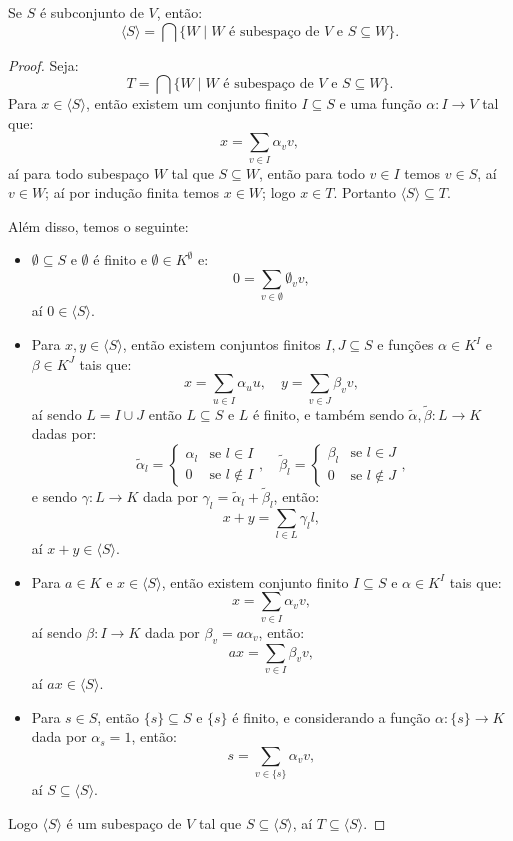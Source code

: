 \documentclass[11pt,twoside,a4paper]{book}
\begin{document}
\begin{proposicao}
Se $S$ é subconjunto de $V$, então:
\[
\langle S\rangle=\bigcap\{W\mid W\text{ é subespaço de }V\text{ e }S\subseteq W\}.
\]
\end{proposicao}
\begin{proof}
Seja:
\[
T=\bigcap\{W\mid W\text{ é subespaço de }V\text{ e }S\subseteq W\}.
\]
Para $x\in \langle S\rangle$, então existem um conjunto finito $I\subseteq S$ e uma função $\alpha:I\rightarrow V$ tal que:
\[
x=\sum\limits_{v\in I}\alpha_vv,
\]
aí para todo subespaço $W$ tal que $S\subseteq W$, então para todo $v\in I$ temos $v\in S$, aí $v\in W$; aí por indução finita temos $x\in W$; logo $x\in T$. Portanto $\langle S\rangle\subseteq T$.

\medskip
\noindent
Além disso, temos o seguinte:
\begin{itemize}
\item $\emptyset\subseteq S$ e $\emptyset$ é finito e $\emptyset\in K^\emptyset$ e:
\[
0=\sum_{v\in\emptyset}\emptyset_vv,
\]
aí $0\in\langle S\rangle$.
\item Para $x,y\in\langle S\rangle$, então existem conjuntos finitos $I,J\subseteq S$ e funções $\alpha\in K^I$ e $\beta\in K^J$ tais que:
\[
x=\sum\limits_{u\in I}\alpha_uu,\quad y=\sum\limits_{v\in J}\beta_vv,
\]
aí sendo $L=I\cup J$ então $L\subseteq S$ e $L$ é finito, e também sendo $\tilde{\alpha},\tilde{\beta}:L\rightarrow K$ dadas por:
\[
\tilde{\alpha}_l=\left\{\begin{array}{cl}\alpha_l&\text{se }l\in I\\0&\text{se }l\notin I\end{array}\right.,\quad\tilde{\beta}_l=\left\{\begin{array}{cl}\beta_l&\text{se }l\in J\\0&\text{se }l\notin J\end{array}\right.,
\]
e sendo $\gamma:L\rightarrow K$ dada por $\gamma_l=\tilde{\alpha}_l+\tilde{\beta}_l$, então:
\[
x+y=\sum_{l\in L}\gamma_ll,
\]
aí $x+y\in\langle S\rangle$.
\item Para $a\in K$ e $x\in\langle S\rangle$, então existem conjunto finito $I\subseteq S$ e $\alpha\in K^I$ tais que:
\[
x=\sum_{v\in I}\alpha_vv,
\]
aí sendo $\beta:I\rightarrow K$ dada por $\beta_v=a\alpha_v$, então:
\[
ax=\sum_{v\in I}\beta_vv,
\]
aí $ax\in\langle S\rangle$.
\item Para $s\in S$, então $\{s\}\subseteq S$ e $\{s\}$ é finito, e considerando a função $\alpha:\{s\}\rightarrow K$ dada por $\alpha_s=1$, então:
\[
s=\sum_{v\in\{s\}}\alpha_vv,
\]
aí $S\subseteq\langle S\rangle$.
\end{itemize}
Logo $\langle S\rangle$ é um subespaço de $V$ tal que $S\subseteq\langle S\rangle$, aí $T\subseteq\langle S\rangle$.
\end{proof}
\end{document}
